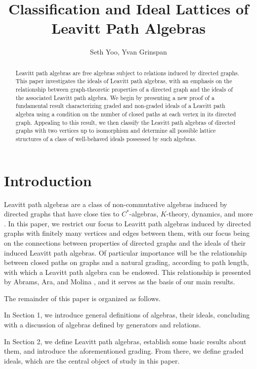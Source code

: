 \documentclass[12pt]{amsart}
\title{Classification and Ideal Lattices of Leavitt Path Algebras}
\author{Seth Yoo, Yvan Grinspan}
\date{}
\theoremstyle{plain} \numberwithin{equation}{section}
\theoremstyle{definition}
\theoremstyle{definition}
\begin{document}
\begin{abstract}
    Leavitt path algebras are free algebras subject to relations induced by directed graphs. This paper investigates the ideals of Leavitt path algebras, with an emphasis on the relationship between graph-theoretic properties of a directed graph and the ideals of the associated Leavitt path algebra. We begin by presenting a new proof of a fundamental result characterizing graded and non-graded ideals of a Leavitt path algebra using a condition on the number of closed paths at each vertex in its directed graph. Appealing to this result, we then classify the Leavitt path algebras of directed graphs with two vertices up to isomorphism and determine all possible lattice structures of a class of well-behaved ideals possessed by such algebras.
\end{abstract}

\maketitle

\section*{\textbf{Introduction}}

Leavitt path algebras are a class of non-commutative algebras induced by directed graphs that have close ties to $C^*$-algebras, $K$-theory, dynamics, and more \cite{ara2009k}\cite{arnone2023graded}\cite{ruiz2013ideal}. In this paper, we restrict our focus to Leavitt path algebras induced by directed graphs with finitely many vertices and edges between them, with our focus being on the connections between properties of directed graphs and the ideals of their induced Leavitt path algebras. Of particular importance will be the relationship between closed paths on graphs and a natural grading, according to path length, with which a Leavitt path algebra can be endowed. This relationship is presented by Abrams, Ara, and Molina \cite{abrams2017leavitt}\cite{abrams2005leavitt}, and it serves as the basis of our main results.  

The remainder of this paper is organized as follows.

In Section 1, we introduce general definitions of algebras, their ideals, concluding with a discussion of algebras defined by generators and relations. 

In Section 2, we define Leavitt path algebras, establish some basic results about them, and introduce the aforementioned grading. From there, we define graded ideals, which are the central object of study in this paper. 
\end{document}

